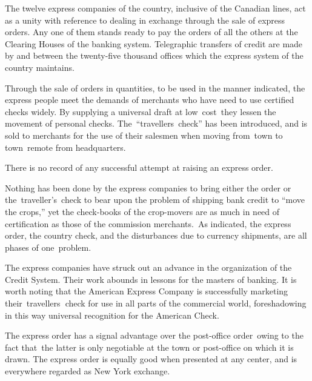 \documentclass[twoside,symmetric,nobib,justified]{tufte-book}
\begin{document}
The twelve express companies of the country, inclusive of the Canadian
lines, act as a unity with reference to dealing in exchange through the
sale of express orders. Any one of them stands ready to pay the orders
of all the others at the Clearing Houses of the banking system.
Telegraphic transfers of credit are made by and between the twenty-five
thousand offices which the express system of the country maintains.~

Through the sale of orders in quantities, to be used in the manner
indicated, the express people meet the demands of merchants who have
need to use certified checks widely. By supplying a universal draft at
low~cost~they lessen the movement of personal checks.
The~``travellers~check'' has been introduced, and is sold to merchants
for the use of their salesmen when moving from~town to town~remote from
headquarters.~~

There is no record of any successful attempt at raising an express
order.~

Nothing has been done by the express companies to bring either the order
or the~traveller's~check to bear upon the problem of shipping bank
credit to ``move the crops,'' yet the check-books of the crop-movers are
as much in need of certification as those of the commission
merchants.~As indicated, the express order, the country check, and the
disturbances due to currency shipments, are all phases of
one~problem.~~~

The express companies have struck out an advance in the organization of
the Credit System. Their work abounds in lessons for the masters of
banking. It is worth noting that the American Express Company is
successfully marketing their~travellers\textbf{~}check for use in all
parts of the commercial world, foreshadowing in this way universal
recognition for the American Check. ~

The express order has a signal advantage over the post-office
order~owing to the fact that~the latter is only negotiable at the town
or post-office on which it is drawn. The express order is equally good
when presented at any center, and is everywhere regarded as New York
exchange.~
\end{document}
